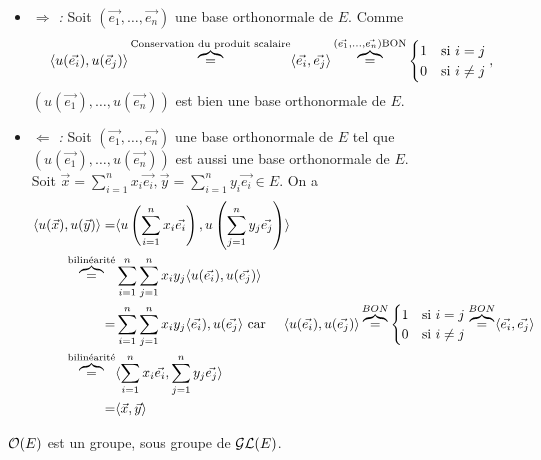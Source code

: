 \documentclass{book}
\begin{document}
\begin{Demonstration}
\begin{itemize}
\item \textit{$ \Rightarrow$ :} Soit $(\vec{e_1},\dots,\vec{e_n})$ une base orthonormale de $E$. Comme
$$\langle u(\vec{e_i}), u(\vec{e}_j)\rangle\overbrace{=}^{\text{Conservation du produit scalaire}}\langle\vec{e_i}, \vec{e_j}\rangle\overbrace{=}^{(\vec{e_1},\dots,\vec{e_n}) \text{BON}}\begin{cases}1&\text{si }i=j\\0&\text{si }i\neq j\end{cases},$$ $(u(\vec{e_1}),\dots,u(\vec{e_n}))$ est bien une base orthonormale de $E$. 
\item \textit{$ \Leftarrow$ :} Soit $(\vec{e_1},\dots,\vec{e_n})$ une base orthonormale de $E$ tel que $(u(\vec{e_1}),\dots,u(\vec{e_n}))$ est aussi une base orthonormale de $E$. \\
Soit $\vec{x}=\sum_{i=1}^n x_i\vec{e_i},\vec{y}=\sum_{i=1}^n y_i\vec{e_i}\in E$. On a 
$$\begin{aligned}
\langle u(\vec{x}), u(\vec{y})\rangle=&\langle u\left(\sum_{i=1}^n x_i\vec{e_i}\right),u\left(\sum_{j=1}^n y_j\vec{e_j}\right)\rangle\\
\overbrace{=}^{\text{bilinéarité}}& \sum_{i=1}^n \sum_{j=1}^n x_i y_j \langle u(\vec{e_i}),u(\vec{e_j})\rangle\\
=& \sum_{i=1}^n \sum_{j=1}^n x_i y_j \langle\vec{e_i}),u(\vec{e_j}\rangle\text{ car }\quad \langle u(\vec{e_i}),u(\vec{e_j})\rangle\overbrace{=}^{BON}\begin{cases}1&\text{si }i=j\\0&\text{si }i\neq j\end{cases}\overbrace{=}^{BON}\langle\vec{e_i},\vec{e_j}\rangle\\
\overbrace{=}^{\text{bilinéarité}}&\langle\sum_{i=1}^n x_i\vec{e_i},\sum_{j=1}^n y_j\vec{e_j}\rangle\\
=&\langle\vec{x}, \vec{y}\rangle\\
\end{aligned}$$
\end{itemize}
\end{Demonstration}
\begin{Proposition}[Groupe]
$\mathcal{O}(E)$ est un groupe, sous groupe de $\mathcal{GL}(E)$.
\end{Proposition}
\end{document}
